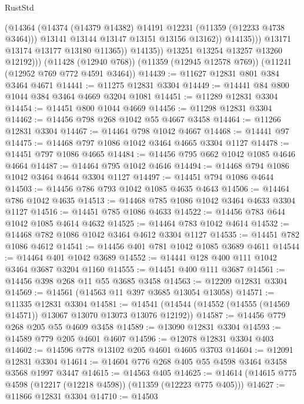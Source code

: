 \begin{lexlean}{RustStd}
\begin{coremodule}
{{{{{{{{{{{{{{{{{{{                          (@14364
                            (@14374 (@14379 @14382) @14191 @12231 (@11359 (@12233 @4738 @3464)))
                            @13141
                            @13144
                            @13147
                            @13151
                            @13156
                            @13162))
                        @14135)))
                  @13171
                  @13174
                  @13177
                  @13180
                  @11365))
              @14135))
          @13251
          @13254
          @13257
          @13260
          @12192)))
    (@11428 (@12940 @768))
    (@11359 (@12945 @12578 @769))
    (@11241 (@12952 @769 @772 @4591 @3464))
@14439 := @11627 @12831 @801 @384 @3464 @4671
@14441 := @11275 @12831 @3304
@14449 := @14441 @84 @800 @1044 @384 @3464 @4669 @3204 @1081
@14451 := @11289 @12831 @3304
@14454 := @14451 @800 @1044 @4669
@14456 := @11298 @12831 @3304
@14462 := @14456 @798 @268 @1042 @55 @4667 @3458
@14464 := @11266 @12831 @3304
@14467 := @14464 @798 @1042 @4667
@14468 := @14441 @97
@14475 := @14468 @797 @1086 @1042 @3464 @4665 @3304 @1127
@14478 := @14451 @797 @1086 @4665
@14484 := @14456 @795 @662 @1042 @1085 @4646 @4664
@14487 := @14464 @795 @1042 @4646
@14494 := @14468 @794 @1086 @1042 @3464 @4644 @3304 @1127
@14497 := @14451 @794 @1086 @4644
@14503 := @14456 @786 @793 @1042 @1085 @4635 @4643
@14506 := @14464 @786 @1042 @4635
@14513 := @14468 @785 @1086 @1042 @3464 @4633 @3304 @1127
@14516 := @14451 @785 @1086 @4633
@14522 := @14456 @783 @644 @1042 @1085 @4614 @4632
@14525 := @14464 @783 @1042 @4614
@14532 := @14468 @782 @1086 @1042 @3464 @4612 @3304 @1127
@14535 := @14451 @782 @1086 @4612
@14541 := @14456 @401 @781 @1042 @1085 @3689 @4611
@14544 := @14464 @401 @1042 @3689
@14552 := @14441 @128 @400 @111 @1042 @3464 @3687 @3204 @1160
@14555 := @14451 @400 @111 @3687
@14561 := @14456 @398 @268 @11 @55 @3685 @3458
@14563 := @12209 @12831 @3304
@14569 := @14561 (@14563 @11 @397 @3685 @13054 @13058)
@14571 := @11335 @12831 @3304
@14581 := @14541 (@14544 (@14552 (@14555 (@14569 @14571)) @13067 @13070 @13073 @13076 @12192))
@14587 := @14456 @779 @268 @205 @55 @4609 @3458
@14589 := @13090 @12831 @3304
@14593 := @14589 @779 @205 @4601 @4607
@14596 := @12078 @12831 @3304 @403
@14602 := @14596 @778 @13102 @205 @4601 @4605 @3703
@14604 := @12091 @12831 @3304
@14614 := @14604 @776 @268 @405 @55 @4598 @3464 @3458 @3568 @1997 @3447
@14615 := @14563 @405
@14625 := @14614 (@14615 @775 @4598 (@12217 (@12218 @4598)) (@11359 (@12223 @775 @405)))
@14627 := @11866 @12831 @3304
@14710 := @14503
}}}}}}}}}}}}}}}}}}}
\end{coremodule}
\end{lexlean}
